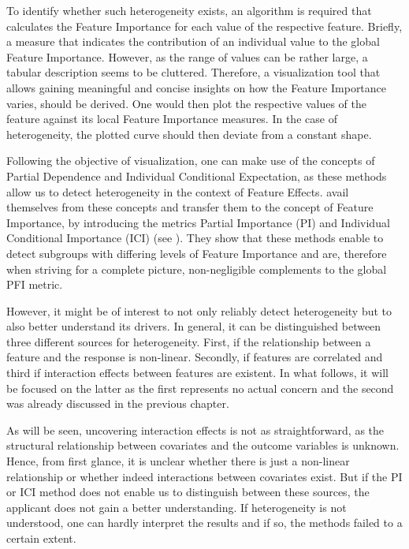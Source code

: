 \documentclass[]{krantz}
\begin{document}
To identify whether such heterogeneity exists, an algorithm is required
that calculates the Feature Importance for each value of the respective
feature. Briefly, a measure that indicates the contribution of an
individual value to the global Feature Importance. However, as the range
of values can be rather large, a tabular description seems to be
cluttered. Therefore, a visualization tool that allows gaining
meaningful and concise insights on how the Feature Importance varies,
should be derived. One would then plot the respective values of the
feature against its local Feature Importance measures. In the case of
heterogeneity, the plotted curve should then deviate from a constant
shape.

Following the objective of visualization, one can make use of the
concepts of Partial Dependence and Individual Conditional Expectation,
as these methods allow us to detect heterogeneity in the context of
Feature Effects. \citet{casalicchio2018visualizing} avail themselves
from these concepts and transfer them to the concept of Feature
Importance, by introducing the metrics Partial Importance (PI) and
Individual Conditional Importance (ICI) (see \citet{Goldstein2013}).
They show that these methods enable to detect subgroups with differing
levels of Feature Importance and are, therefore when striving for a
complete picture, non-negligible complements to the global PFI metric.

However, it might be of interest to not only reliably detect
heterogeneity but to also better understand its drivers. In general, it
can be distinguished between three different sources for heterogeneity.
First, if the relationship between a feature and the response is
non-linear. Secondly, if features are correlated and third if
interaction effects between features are existent. In what follows, it
will be focused on the latter as the first represents no actual concern
and the second was already discussed in the previous chapter.

As will be seen, uncovering interaction effects is not as
straightforward, as the structural relationship between covariates and
the outcome variables is unknown. Hence, from first glance, it is
unclear whether there is just a non-linear relationship or whether
indeed interactions between covariates exist. But if the PI or ICI
method does not enable us to distinguish between these sources, the
applicant does not gain a better understanding. If heterogeneity is not
understood, one can hardly interpret the results and if so, the methods
failed to a certain extent.
\end{document}
